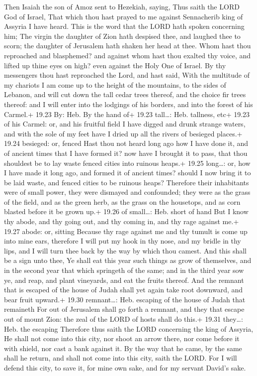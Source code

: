  Then Isaiah the son of Amoz sent to Hezekiah, saying,
Thus saith the LORD God of Israel, That which thou hast prayed to me
against Sennacherib king of Assyria I have heard.  This is
the word that the LORD hath spoken concerning him; The virgin the
daughter of Zion hath despised thee, and laughed thee to scorn; the
daughter of Jerusalem hath shaken her head at thee.  Whom
hast thou reproached and blasphemed? and against whom hast thou exalted
thy voice, and lifted up thine eyes on high? even against the Holy One
of Israel.  By thy messengers thou hast reproached the
Lord, and hast said, With the multitude of my chariots I am come up to
the height of the mountains, to the sides of Lebanon, and will cut down
the tall cedar trees thereof, and the choice fir trees thereof: and I
will enter into the lodgings of his borders, and into the forest of his
Carmel.+ 19.23 By: Heb. By the hand of+ 19.23 tall\ldots: Heb. tallness,
etc+ 19.23 of his Carmel: or, and his fruitful field  I
have digged and drunk strange waters, and with the sole of my feet have
I dried up all the rivers of besieged places.+ 19.24 besieged: or,
fenced  Hast thou not heard long ago how I have done it,
and of ancient times that I have formed it? now have I brought it to
pass, that thou shouldest be to lay waste fenced cities into ruinous
heaps.+ 19.25 long\ldots: or, how I have made it long ago, and formed it
of ancient times? should I now bring it to be laid waste, and fenced
cities to be ruinous heaps?  Therefore their inhabitants
were of small power, they were dismayed and confounded; they were as the
grass of the field, and as the green herb, as the grass on the
housetops, and as corn blasted before it be grown up.+ 19.26 of
small\ldots: Heb. short of hand  But I know thy abode, and
thy going out, and thy coming in, and thy rage against me.+ 19.27 abode:
or, sitting  Because thy rage against me and thy tumult is
come up into mine ears, therefore I will put my hook in thy nose, and my
bridle in thy lips, and I will turn thee back by the way by which thou
camest.  And this shall be a sign unto thee, Ye shall eat
this year such things as grow of themselves, and in the second year that
which springeth of the same; and in the third year sow ye, and reap, and
plant vineyards, and eat the fruits thereof.  And the
remnant that is escaped of the house of Judah shall yet again take root
downward, and bear fruit upward.+ 19.30 remnant\ldots: Heb. escaping of
the house of Judah that remaineth  For out of Jerusalem
shall go forth a remnant, and they that escape out of mount Zion: the
zeal of the LORD of hosts shall do this.+ 19.31 they\ldots: Heb. the
escaping  Therefore thus saith the LORD concerning the king
of Assyria, He shall not come into this city, nor shoot an arrow there,
nor come before it with shield, nor cast a bank against it.
 By the way that he came, by the same shall he return, and
shall not come into this city, saith the LORD.  For I will
defend this city, to save it, for mine own sake, and for my servant
David's sake.

